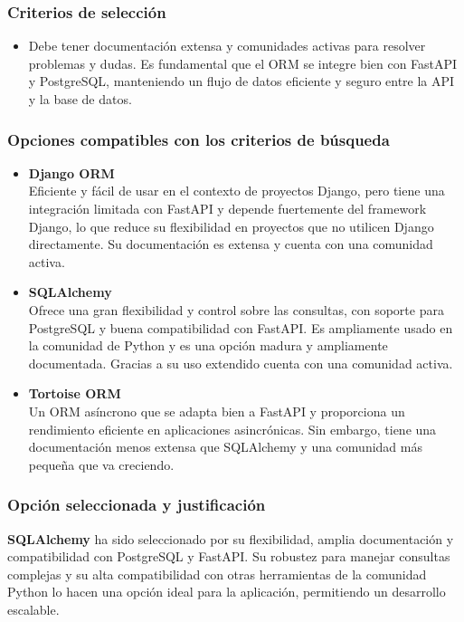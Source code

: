 \subsubsection{Criterios de selección}
\begin{itemize}
    \item Debe tener documentación extensa y comunidades activas para resolver problemas y dudas. Es fundamental que el ORM se integre bien con FastAPI y PostgreSQL, manteniendo un flujo de datos eficiente y seguro entre la API y la base de datos.
\end{itemize}

\subsubsection{Opciones compatibles con los criterios de búsqueda}
\begin{itemize}
    \item \textbf{Django ORM}\\
        Eficiente y fácil de usar en el contexto de proyectos Django, pero tiene una integración limitada con FastAPI y depende fuertemente del framework Django, lo que reduce su flexibilidad en proyectos que no utilicen Django directamente. Su documentación es extensa y cuenta con una comunidad activa.
    \item \textbf{SQLAlchemy}\\
        Ofrece una gran flexibilidad y control sobre las consultas, con soporte para PostgreSQL y buena compatibilidad con FastAPI. Es ampliamente usado en la comunidad de Python y es una opción madura y ampliamente documentada. Gracias a su uso extendido cuenta con una comunidad activa.
    \item \textbf{Tortoise ORM}\\
        Un ORM asíncrono que se adapta bien a FastAPI y proporciona un rendimiento eficiente en aplicaciones asincrónicas. Sin embargo, tiene una documentación menos extensa que SQLAlchemy y una comunidad más pequeña que va creciendo.
\end{itemize}

\subsubsection{Opción seleccionada y justificación}
\textbf{SQLAlchemy} ha sido seleccionado por su flexibilidad, amplia documentación y compatibilidad con PostgreSQL y FastAPI. Su robustez para manejar consultas complejas y su alta compatibilidad con otras herramientas de la comunidad Python lo hacen una opción ideal para la aplicación, permitiendo un desarrollo escalable\cite{myers2015essential}.


